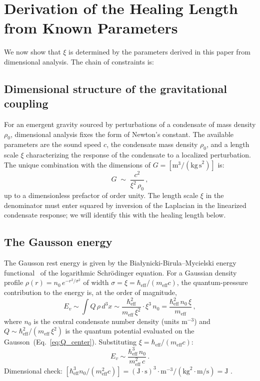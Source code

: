 \documentclass[12pt, a4paper]{article}
\newcommand{\meff}{m_{\mathrm{eff}}}
\newcommand{\heff}{\hbar_{\mathrm{eff}}}
\begin{document}
\section{Derivation of the Healing Length from Known Parameters}
\label{sec:derivation}

We now show that $\xi$ is determined by the parameters
derived in this paper from dimensional analysis. The chain of constraints is:

\subsection{Dimensional structure of the gravitational coupling}

For an emergent gravity sourced by perturbations of a condensate of mass density $\rho_0$, dimensional analysis fixes the form of Newton's constant. The available parameters are the sound speed $c$, the condensate mass density $\rho_0$, and a length scale $\xi$ characterizing the response of the condensate to a localized perturbation. The unique combination with the dimensions of $G = [\mathrm{m}^3/(\mathrm{kg\,s}^2)]$ is:
\begin{equation}
    G \;\sim\; \frac{c^2}{\xi^2\,\rho_0}\,,
\label{eq:G}
\end{equation}
up to a dimensionless prefactor of order unity. The length scale $\xi$ in the denominator must enter squared by inversion of the Laplacian in the linearized condensate response; we will identify this with the healing length below.

\subsection{The Gausson energy}

The Gausson rest energy is given by the Bia{\l}ynicki-Birula--Mycielski energy functional~\cite{bialynicki_birula_1976, bialynicki_birula_1979} of the logarithmic Schr\"{o}dinger equation. For a Gaussian density profile $\rho(r) = n_0\,e^{-r^2/\sigma^2}$ of width $\sigma = \xi = \heff/(\meff c)$, the quantum-pressure contribution to the energy is, at the order of magnitude,
\begin{equation}
    E_v \sim \int Q\,\rho\,d^3x
    \sim \frac{\heff^2}{\meff\,\xi^2}\cdot\xi^3\,n_0
    = \frac{\heff^2\,n_0\,\xi}{\meff}\,,
\label{eq:Ev}
\end{equation}
where $n_0$ is the central condensate number density
(units $\mathrm{m}^{-3}$) and $Q\sim\heff^2/(\meff\,\xi^2)$
is the quantum potential evaluated on the
Gausson~(Eq.~\ref{eq:Q_center}). Substituting
$\xi = \heff/(\meff c)$:
\begin{equation}
    E_v \sim \frac{\heff^3\,n_0}{\meff^2\,c}\,.
\label{eq:Ev2}
\end{equation}
Dimensional check: $[\heff^3 n_0/(\meff^2 c)] =
(\mathrm{J\cdot s})^3 \cdot \mathrm{m}^{-3} /
(\mathrm{kg}^2 \cdot \mathrm{m/s}) = \mathrm{J}$ \checkmark.
\end{document}
